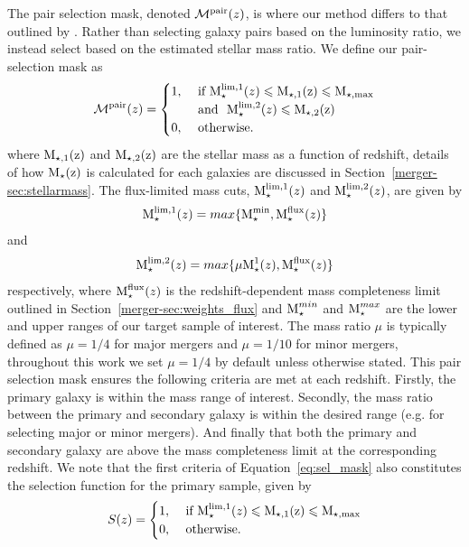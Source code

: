The pair selection mask, denoted $\mathcal{M}^{\rm{pair}}(z)$, is where our method differs to that outlined by . Rather than selecting galaxy pairs based on the luminosity ratio, we instead select based on the estimated stellar mass ratio. We define our pair-selection mask as
\begin{equation}\label{eq:sel_mask}
\mathcal{M}^{\rm{pair}}(z) = 
\begin{cases}
1, & \text{ if } \text{M}_{\star}^{\rm{lim},1}(z) \leqslant \rm{M}_{\star,1}(z) \leqslant \rm{M}_{\star,max}  \\ 
	& \text{ and }~ \text{M}_{\star}^{\rm{lim},2}(z) \leqslant \rm{M}_{\star,2}(z) \\
0, & \text{ otherwise. } 
\end{cases}
\end{equation}
where $\rm{M}_{\star,1}(z)$ and $\rm{M}_{\star,2}(z)$ are the stellar mass as a function of redshift, details of how $\rm{M}_{\star}(z)$ is calculated for each galaxies are discussed in Section~\ref{merger-sec:stellarmass}. The flux-limited mass cuts, $\text{M}_{\star}^{\rm{lim},1}(z)$ and $\text{M}_{\star}^{\rm{lim},2}(z)$, are given by
\begin{equation}\label{eq:fluxlim_pri}
\text{M}_{\star}^{\rm{lim},1}(z)= max \{ \text{M}_{\star}^{\rm{min}}, \text{M}_{\star}^{\rm{flux}}(z) \}
\end{equation}
and
\begin{equation}\label{eq:fluxlim_sec}
\text{M}_{\star}^{\rm{lim},2}(z) = max \{ \mu \text{M}_{\star}^{1}(z), \text{M}_{\star}^{\rm{flux}}(z) \}
\end{equation}
respectively, where $\text{M}_{\star}^{\rm{flux}}(z)$ is the redshift-dependent mass completeness limit outlined in Section~\ref{merger-sec:weights_flux} and $\text{M}_{\star}^{min}$ and $\text{M}_{\star}^{max}$ are the lower and upper ranges of our target sample of interest. The mass ratio $\mu$ is typically defined as $\mu = 1/4$ for major mergers and $\mu = 1/10$ for minor mergers, throughout this work we set $\mu = 1/4$ by default unless otherwise stated. This pair selection mask ensures the following criteria are met at each redshift. Firstly, the primary galaxy is within the mass range of interest. Secondly, the mass ratio between the primary and secondary galaxy is within the desired range (e.g. for selecting major or minor mergers). And finally that both the primary and secondary galaxy are above the mass completeness limit at the corresponding redshift. We note that the first criteria of Equation~\ref{eq:sel_mask} also constitutes the selection function for the primary sample, given by
\begin{equation}\label{eq:pri_sel}
S(z) = 
\begin{cases}
1, & \text{ if } \text{M}_{\star}^{\rm{lim},1}(z) \leqslant \rm{M}_{\star,1}(z) \leqslant \rm{M}_{\star,max}  \\ 
0, & \text{ otherwise. } 
\end{cases}
\end{equation}



